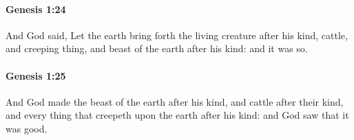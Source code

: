 		\paragraph{Genesis 1:24} %
			\label{GENESIS-1-24}

			And God said, Let the earth bring forth the living creature after his kind, cattle, and creeping thing, and beast of the earth after his kind: and it was so.


		\paragraph{Genesis 1:25} %
			\label{GENESIS-1-25}

			And God made the beast of the earth after his kind, and cattle after their kind, and every thing that creepeth upon the earth after his kind: and God saw that it was good.


